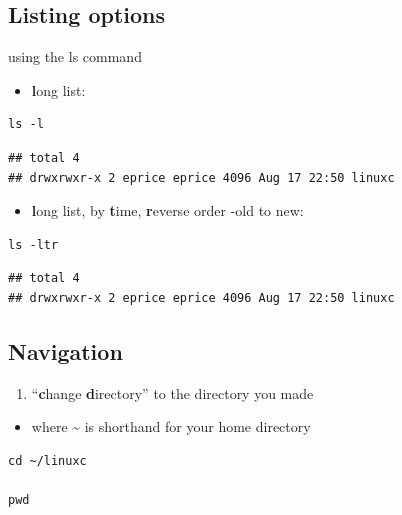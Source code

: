 \documentclass[
]{book}
\providecommand{\tightlist}{%
  \setlength{\itemsep}{0pt}\setlength{\parskip}{0pt}}
\begin{document}
\hypertarget{listing-options}{%
\subsection{Listing options}\label{listing-options}}

using the ls command

\begin{itemize}
\tightlist
\item
  \textbf{l}ong list:
\end{itemize}

\begin{verbatim}
ls -l
\end{verbatim}

\begin{verbatim}
## total 4
## drwxrwxr-x 2 eprice eprice 4096 Aug 17 22:50 linuxc
\end{verbatim}

\begin{itemize}
\tightlist
\item
  \textbf{l}ong list, by \textbf{t}ime, \textbf{r}everse order -old to new:
\end{itemize}

\begin{verbatim}
ls -ltr
\end{verbatim}

\begin{verbatim}
## total 4
## drwxrwxr-x 2 eprice eprice 4096 Aug 17 22:50 linuxc
\end{verbatim}

\hypertarget{navigation}{%
\subsection{Navigation}\label{navigation}}

\begin{enumerate}
\def\labelenumi{\arabic{enumi})}
\tightlist
\item
  ``\textbf{c}hange \textbf{d}irectory'' to the directory you made
\end{enumerate}

\begin{itemize}
\tightlist
\item
  where \textasciitilde{} is shorthand for your home directory
\end{itemize}

\begin{verbatim}
cd ~/linuxc

pwd
\end{verbatim}
\end{document}

